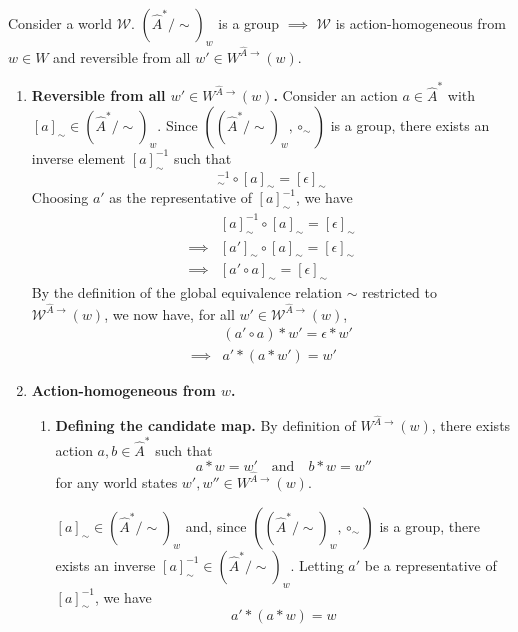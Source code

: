 \begin{propositionE}[][normal]
    Consider a world $\mathscr{W}$.
    $(\hat{A}^{*}/\sim)_{w}$ is a group $\implies$ $\mathscr{W}$ is action-homogeneous from $w \in W$ and reversible from all $w' \in W^{\hat{A}\to}(w)$.
\end{propositionE}
\begin{proofE}
\begin{enumerate}
    \item \textbf{Reversible from all $w' \in W^{\hat{A}\to}(w)$.}
    Consider an action $a \in \hat{A}^{*}$ with $[a]_{\sim} \in (\hat{A}^{*}/\sim)_{w}$.
    Since $((\hat{A}^{*}/\sim)_{w}, \circ_{\sim})$ is a group, there exists an inverse element $[a]^{-1}_{\sim}$ such that
    \begin{equation}
        [a]^{-1}_{\sim} \circ [a]_{\sim} = [\epsilon]_{\sim}
    \end{equation}
    Choosing $a'$ as the representative of $[a]^{-1}_{\sim}$, we have
    \begin{align}
        & [a]^{-1}_{\sim} \circ [a]_{\sim} = [\epsilon]_{\sim} \\
        \implies & [a']_{\sim} \circ [a]_{\sim} = [\epsilon]_{\sim} \\
        \implies & [a' \circ a]_{\sim} = [\epsilon]_{\sim}
    \end{align}
    By the definition of the global equivalence relation $\sim$ restricted to $\mathscr{W}^{\hat{A}\to}(w)$, we now have, for all $w' \in \mathscr{W}^{\hat{A}\to}(w)$,
    \begin{align}
        & (a' \circ a) \ast w' = \epsilon \ast w' \\
        \implies & a' \ast (a \ast w') = w'
    \end{align}

    \item \textbf{Action-homogeneous from $w$.}
    \begin{enumerate}
        \item \textbf{Defining the candidate map.}
        By definition of $W^{\hat{A}\to}(w)$, there exists action $a, b \in \hat{A}^{*}$ such that
        \begin{equation}
            a \ast w = w' \quad \text{and} \quad b \ast w = w''
        \end{equation}
        for any world states $w', w'' \in W^{\hat{A}\to}(w)$.
    
        $[a]_{\sim} \in (\hat{A}^{*}/\sim)_{w}$ and, since $((\hat{A}^{*}/\sim)_{w}, \circ_{\sim})$ is a group, there exists an inverse $[a]^{-1}_{\sim} \in (\hat{A}^{*}/\sim)_{w}$.
        Letting $a'$ be a representative of $[a]^{-1}_{\sim}$, we have
        \begin{equation}
            a' \ast (a \ast w) = w
        \end{equation}
    

\end{enumerate}
\end{enumerate}
\end{proofE}
